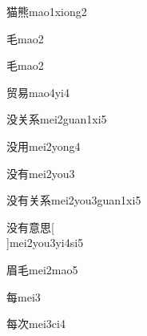 \begin{verbete}[11;14]{猫熊}{mao1xiong2}
\end{verbete}

\begin{verbete}[4]{毛}{mao2}
\end{verbete}
\begin{verbete*}[4]{毛}{mao2}
\end{verbete*}

\begin{verbete}[9;8]{贸易}{mao4yi4}
\end{verbete}

\begin{verbete}[7;6;7]{没关系}{mei2guan1xi5}
\end{verbete}

\begin{verbete}[7;5]{没用}{mei2yong4}
\end{verbete}

\begin{verbete}[7;6]{没有}{mei2you3}
\end{verbete}

\begin{verbete}[7;6;6;7]{没有关系}{mei2you3guan1xi5}
\end{verbete}

\begin{verbete}[7;6;13;9]{没有意思}[\\]{mei2you3yi4si5}
\end{verbete}

\begin{verbete}[9;4]{眉毛}{mei2mao5}
\end{verbete}

\begin{verbete}[7]{每}{mei3}
\end{verbete}

\begin{verbete}[7;6]{每次}{mei3ci4}
\end{verbete}

